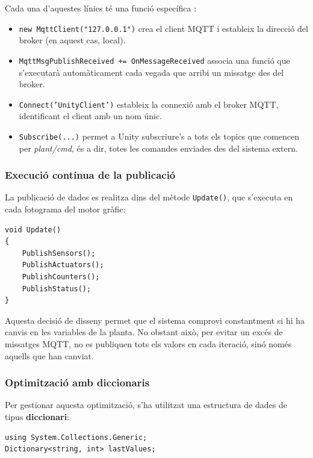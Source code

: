 \documentclass[a4paper,11pt,DIV=13,headings=normal,abstract=true,twoside=semi]{article}
\begin{document}
Cada una d'aquestes línies té una funció específica \cite{mqtt_unity_guide}:

\begin{itemize}
    \item \texttt{new MqttClient("127.0.0.1")} crea el client MQTT i estableix la direcció del broker (en aquest cas, local).
    
    \item \texttt{MqttMsgPublishReceived += OnMessageReceived} associa una funció que s'executarà automàticament cada vegada que arribi un missatge des del broker.
    
    \item \texttt{Connect('UnityClient')} estableix la connexió amb el broker MQTT, identificant el client amb un nom únic.
    
    \item \texttt{Subscribe(...)} permet a Unity subscriure's a tots els topics que comencen per \textit{plant/cmd}, és a dir, totes les comandes enviades des del sistema extern.
\end{itemize}

\subsubsection*{Execució contínua de la publicació}

La publicació de dades es realitza dins del mètode \texttt{Update()}, que s'executa en cada fotograma del motor gràfic:

\begin{lstlisting}[style=simple]
void Update()
{
    PublishSensors();
    PublishActuators();
    PublishCounters();
    PublishStatus();
}
\end{lstlisting}

Aquesta decisió de disseny permet que el sistema comprovi constantment si hi ha canvis en les variables de la planta. No obstant això, per evitar un excés de missatges MQTT, no es publiquen tots els valors en cada iteració, sinó només aquells que han canviat.

\subsubsection*{Optimització amb diccionaris}

Per gestionar aquesta optimització, s'ha utilitzat una estructura de dades de tipus \textbf{diccionari}:

\begin{lstlisting}[style=simple]
using System.Collections.Generic;
Dictionary<string, int> lastValues;
\end{lstlisting}
\end{document}
